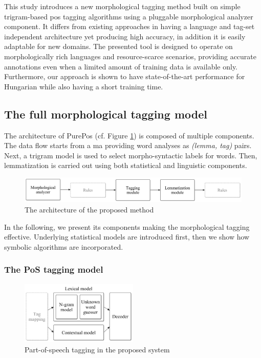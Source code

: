 This study introduces a new morphological tagging method built on simple trigram-based \gls{pos} tagging algorithms using a pluggable morphological analyzer component.
It differs from existing approaches in having a language and tag-set independent architecture yet producing high accuracy, in addition it is easily adaptable for new domains.
The presented tool is designed to operate on morphologically rich languages and resource-scarce scenarios, providing accurate annotations even when a limited amount of training data is available only.
Furthermore, our approach is shown to have state-of-the-art performance for Hungarian while also having a short training time.

\subsection{The full morphological tagging model}
\label{sec:purepos}

The architecture of PurePos (cf. Figure \ref{fig:purepos-arch}) is composed of multiple components. 
The data flow starts from a \gls{ma} providing word analyses as \emph{(lemma, tag)} pairs. 
Next, a trigram model is used to select morpho-syntactic labels for words. 
Then, lemmatization is carried out using both statistical and linguistic components. 

\begin{figure}[H]
  \centering
  \includegraphics[width=1\textwidth]{MorphTagging/architecture.png} 
  \caption{The architecture of the proposed method}
  \label{fig:purepos-arch}
\end{figure}

In the following, we present its components making the morphological tagging effective. 
Underlying statistical models are introduced first, then we show how symbolic algorithms are incorporated. 

\subsubsection{The PoS tagging model}

\begin{figure}[H]
  \centering
  \includegraphics[width=0.5\textwidth]{MorphTagging/pos_arch.png} 
  \caption{Part-of-speech tagging in the proposed system}
  \label{fig:pos_arch}
\end{figure}

